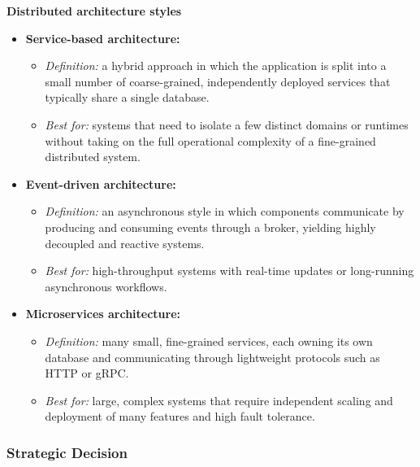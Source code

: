 \textbf{Distributed architecture styles}
\begin{itemize}
    \item \textbf{Service-based architecture:}
    \begin{itemize}
        \item \textit{Definition:} a hybrid approach in which the application is split into a small number of coarse-grained, independently deployed services that typically share a single database.
        \item \textit{Best for:} systems that need to isolate a few distinct domains or runtimes without taking on the full operational complexity of a fine-grained distributed system.
    \end{itemize}
    \item \textbf{Event-driven architecture:}
    \begin{itemize}
        \item \textit{Definition:} an asynchronous style in which components communicate by producing and consuming events through a broker, yielding highly decoupled and reactive systems.
        \item \textit{Best for:} high-throughput systems with real-time updates or long-running asynchronous workflows.
    \end{itemize}
    \item \textbf{Microservices architecture:}
    \begin{itemize}
        \item \textit{Definition:} many small, fine-grained services, each owning its own database and communicating through lightweight protocols such as HTTP or gRPC.
        \item \textit{Best for:} large, complex systems that require independent scaling and deployment of many features and high fault tolerance.
    \end{itemize}
\end{itemize}

\subsubsection{Strategic Decision}
\label{subsubsec:architecture-decision}

